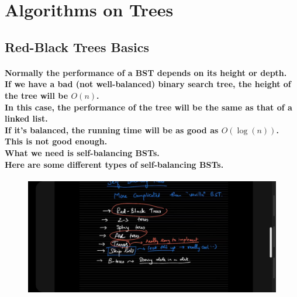 \documentclass{article}
\begin{document}
\section{Algorithms on Trees}


\subsection{Red-Black Trees Basics}

\paragraph{
    Normally the performance of a BST depends on its height or depth.\\
    If we have a bad (not well-balanced) binary search tree, the height of the tree will be $O(n)$.\\
    In this case, the performance of the tree will be the same as that of a linked list.\\
    If it's balanced, the running time will be as good as $O(\log(n))$. This is not good enough.\\
    What we need is self-balancing BSTs.\\
    Here are some different types of self-balancing BSTs.\\
}

\begin{figure}[H]
    \includegraphics[width=\textwidth]{differenttypesofbst.jpg}
\end{figure}
\end{document}

